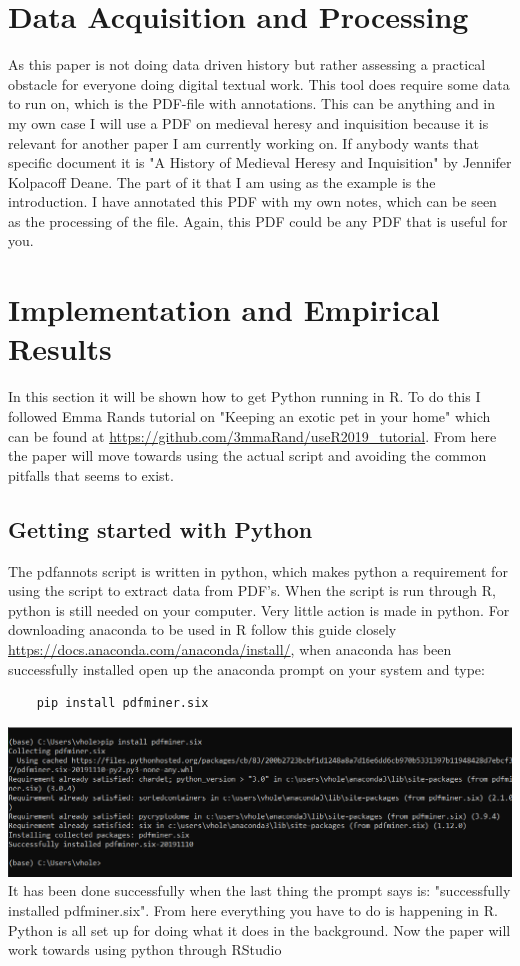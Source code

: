 \documentclass{article}
\begin{document}
\section{Data Acquisition and Processing}
As this paper is not doing data driven history but rather assessing a practical obstacle for everyone doing digital textual work. This tool does require some data to run on, which is the PDF-file with annotations. This can be anything and in my own case I will use a PDF on medieval heresy and inquisition because it is relevant for another paper I am currently working on. If anybody wants that specific document it is "A History of Medieval Heresy and Inquisition" by Jennifer Kolpacoff Deane. The part of it that I am using as the example is the introduction. I have annotated this PDF with my own notes, which can be seen as the processing of the file. Again, this PDF could be any PDF that is useful for you.

\section{Implementation and Empirical Results}
In this section it will be shown how to get Python running in R. To do this I followed Emma Rands tutorial on "Keeping an exotic pet in your home" which can be found at \url{https://github.com/3mmaRand/useR2019_tutorial}. From here the paper will move towards using the actual script and avoiding the common pitfalls that seems to exist.  
\subsection{Getting started with Python}
The pdfannots script is written in python, which makes python a requirement for using the script to extract data from PDF’s. When the script is run through R, python is still needed on your computer. Very little action is made in python. For downloading anaconda to be used in R follow this guide closely \url{https://docs.anaconda.com/anaconda/install/}, when anaconda has been successfully installed open up the anaconda prompt on your system and type: 
\begin{verbatim}
    pip install pdfminer.six
\end{verbatim}
\includegraphics[scale=0.53]{Install_pdfminer_six.PNG}\newline
It has been done successfully when the last thing the prompt says is: "successfully installed pdfminer.six". From here everything you have to do is happening in R. Python is all set up for doing what it does in the background. Now the paper will work towards using python through RStudio
\end{document}
